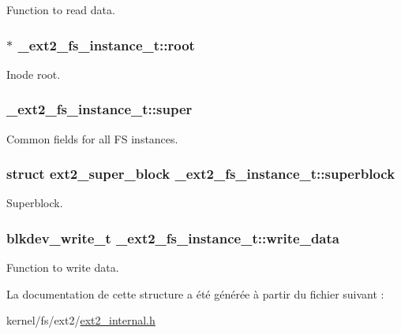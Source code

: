 Function to read data. \hypertarget{struct__ext2__fs__instance__t_a52f883f2d709ab3b4dff94b5b7100973}{
\subsubsection[{root}]{$\ast$ \-\_\-ext2\-\_\-fs\-\_\-instance\-\_\-t\-::root}}\label{struct__ext2__fs__instance__t_a52f883f2d709ab3b4dff94b5b7100973}
Inode root. \hypertarget{struct__ext2__fs__instance__t_a456ee695fb1a0b71edadda9f4504ca2d}{
\subsubsection[{super}]{ \-\_\-ext2\-\_\-fs\-\_\-instance\-\_\-t\-::super}}\label{struct__ext2__fs__instance__t_a456ee695fb1a0b71edadda9f4504ca2d}
Common fields for all F\-S instances. \hypertarget{struct__ext2__fs__instance__t_a81ad8719743e20da6f661c2586b56ad2}{
\subsubsection[{superblock}]{\setlength{\rightskip}{0pt plus 5cm}struct {\bf ext2\-\_\-super\-\_\-block} \-\_\-ext2\-\_\-fs\-\_\-instance\-\_\-t\-::superblock}}\label{struct__ext2__fs__instance__t_a81ad8719743e20da6f661c2586b56ad2}
Superblock. \hypertarget{struct__ext2__fs__instance__t_a90d334c34e9aeea01be13fe1ed66ba7b}{
\subsubsection[{write\-\_\-data}]{\setlength{\rightskip}{0pt plus 5cm}blkdev\-\_\-write\-\_\-t \-\_\-ext2\-\_\-fs\-\_\-instance\-\_\-t\-::write\-\_\-data}}\label{struct__ext2__fs__instance__t_a90d334c34e9aeea01be13fe1ed66ba7b}
Function to write data. 

La documentation de cette structure a été générée à partir du fichier suivant \-:\begin{DoxyCompactItemize}
\item 
kernel/fs/ext2/\hyperlink{ext2__internal_8h}{ext2\-\_\-internal.\-h}\end{DoxyCompactItemize}
